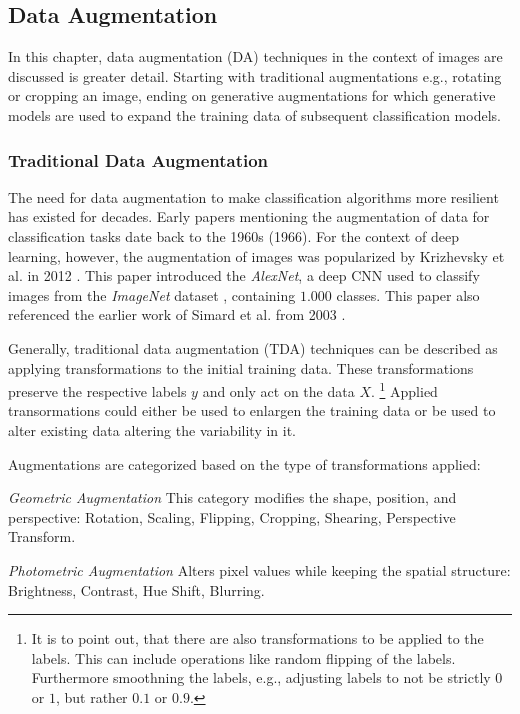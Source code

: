 \subsection[Data Augmentation - DA]{Data Augmentation}\label{theoretical_da}
In this chapter, data augmentation (DA) techniques in the context of images are discussed is greater detail. Starting with traditional augmentations e.g., rotating or cropping an image, ending on generative augmentations for which generative models are used to expand the training data of subsequent classification models.

\subsubsection[Traditional Data Augmentation - TDA]{Traditional Data Augmentation}\label{theoretical_tda}
The need for data augmentation to make classification algorithms more resilient has existed for decades. Early papers mentioning the augmentation of data for classification tasks date back to the 1960s \cite{Nagy1966} (1966). For the context of deep learning, however, the augmentation of images was popularized by Krizhevsky et al. in 2012 \cite{Krizhevsky2012traditionaldataaugmentation}. This paper introduced the \textit{AlexNet}, a deep CNN used to classify images from the \textit{ImageNet} dataset \cite{ImageNetDataset5206848}, containing $1.000$ classes. This paper also referenced the earlier work of Simard et al. from 2003 \cite{Simard2003bestpracticesforcnns}.

Generally, traditional data augmentation (TDA) techniques can be described as applying transformations to the initial training data. These transformations preserve the respective labels \(y\) and only act on the data \(X\). \footnote{It is to point out, that there are also transformations to be applied to the labels. This can include operations like random flipping of the labels. Furthermore smoothning the labels, e.g., adjusting labels to not be strictly $0$ or $1$, but rather $0.1$ or $0.9$.} Applied transormations could either be used to enlargen the training data or be used to alter existing data altering the variability in it.

Augmentations are categorized based on the type of transformations applied:

\noindent\textit{Geometric Augmentation}
This category modifies the shape, position, and perspective: Rotation, Scaling, Flipping, Cropping, Shearing, Perspective Transform.

\noindent\textit{Photometric Augmentation}
Alters pixel values while keeping the spatial structure: Brightness, Contrast, Hue Shift, Blurring.

